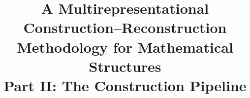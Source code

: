 \documentclass[11pt,a4paper]{article}
\theoremstyle{definition}
\theoremstyle{plain}
\newcommand{\Lam}{\Lambda}
\newcommand{\Sp}{\mathrm{Sp}}
\newcommand{\Ge}{\mathrm{Ge}}
\newcommand{\To}{\mathrm{To}}
\newcommand{\Al}{\mathrm{Al}}
\newcommand{\Nu}{\mathrm{Nu}}
\newcommand{\Fo}{\mathrm{Fo}}
\newcommand{\Cl}{\mathrm{Cl}}
\newcommand{\Corr}{\mathrm{Corr}}
\newcommand{\Inv}{\mathrm{Inv}}
\newcommand{\An}{\mathrm{An}}
\newcommand{\Ob}{\mathfrak{O}}
\newcommand{\Ecal}{\mathcal{E}}
\newcommand{\Ocal}{\mathcal{O}}
\newcommand{\Acal}{\mathcal{A}}
\newcommand{\philam}{\phi_{\lambda\mu}}
\newcommand{\rholam}{\rho_{\lambda}}
\newcommand{\Vmat}{\mathbf{V}}
\newcommand{\Jset}{\mathcal{J}}
\newcommand{\dd}{\,\mathrm{d}}
\begin{document}
\theoremstyle{plain}
\newtheorem{proposition}[definition]{Proposition}
\newtheorem{theorem}[definition]{Theorem}
\newtheorem{lemma}[definition]{Lemma}
\newtheorem{corollary}[definition]{Corollary}

\newcommand{\Lam}{\Lambda}
\newcommand{\Sp}{\mathrm{Sp}}
\newcommand{\Ge}{\mathrm{Ge}}
\newcommand{\To}{\mathrm{To}}
\newcommand{\Al}{\mathrm{Al}}
\newcommand{\Nu}{\mathrm{Nu}}
\newcommand{\Fo}{\mathrm{Fo}}
\newcommand{\Cl}{\mathrm{Cl}}
\newcommand{\Corr}{\mathrm{Corr}}
\newcommand{\Inv}{\mathrm{Inv}}
\newcommand{\An}{\mathrm{An}}
\newcommand{\Ob}{\mathfrak{O}}
\newcommand{\Ecal}{\mathcal{E}}
\newcommand{\Ocal}{\mathcal{O}}
\newcommand{\Acal}{\mathcal{A}}
\newcommand{\Mcal}{\mathcal{M}}
\newcommand{\Hcal}{\mathcal{H}}
\newcommand{\philam}{\phi_{\lambda\mu}}
\newcommand{\rholam}{\rho_{\lambda}}
\newcommand{\Vmat}{\mathbf{V}}
\newcommand{\Jset}{\mathcal{J}}
\newcommand{\dd}{\,\mathrm{d}}
\newcommand{\op}[1]{\operatorname{#1}}
\newcommand{\spec}{\sigma}
\newcommand{\hilb}{\mathcal{H}}
\newcommand{\Cat}{\mathbf{Cat}}
\newcommand{\Set}{\mathbf{Set}}
\newcommand{\Vect}{\mathbf{Vect}}
\newcommand{\Grp}{\mathbf{Grp}}
\newcommand{\Rng}{\mathbf{Rng}}
\newcommand{\Top}{\mathbf{Top}}
\newcommand{\Man}{\mathbf{Man}}

\title{%
  \textbf{A Multirepresentational Construction--Reconstruction\\
  Methodology for Mathematical Structures}\\[4pt]
  \large Part II: The Construction Pipeline
}
\author{}
\date{}
\end{document}
